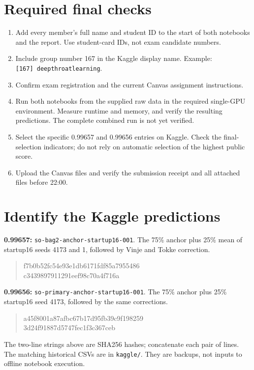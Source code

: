 \documentclass[a4paper,11pt]{article}
\begin{document}
\section{Required final checks}
\begin{enumerate}
\item Add every member's full name and student ID to the start of both notebooks and the report. Use student-card IDs, not exam candidate numbers.
\item Include group number 167 in the Kaggle display name. Example:\\ \texttt{[167] deepthroatlearning}.
\item Confirm exam registration and the current Canvas assignment instructions.
\item Run both notebooks from the supplied raw data in the required single-GPU environment. Measure runtime and memory, and verify the resulting predictions. The complete combined run is not yet verified.
\item Select the specific 0.99657 and 0.99656 entries on Kaggle. Check the final-selection indicators; do not rely on automatic selection of the highest public score.
\item Upload the Canvas files and verify the submission receipt and all attached files before 22:00.
\end{enumerate}

\section{Identify the Kaggle predictions}
\textbf{0.99657:} \texttt{so-bag2-anchor-startup16-001}. The 75\% anchor plus 25\% mean of startup16 seeds 4173 and 1, followed by Vinje and Tokke correction.
\begin{quote}\small\ttfamily
f7b0b52fc54e93e1db6171fdf85a7955486\\
c3439897911291eef98c70a4f716a
\end{quote}
\textbf{0.99656:} \texttt{so-primary-anchor-startup16-001}. The 75\% anchor plus 25\% startup16 seed 4173, followed by the same corrections.
\begin{quote}\small\ttfamily
a45f8001a87afbc67b17d95fb39c9f198259\\
3d24f91887d5747fec1f3c367ceb
\end{quote}
The two-line strings above are SHA256 hashes; concatenate each pair of lines. The matching historical CSVs are in \texttt{kaggle/}. They are backups, not inputs to offline notebook execution.
\end{document}
